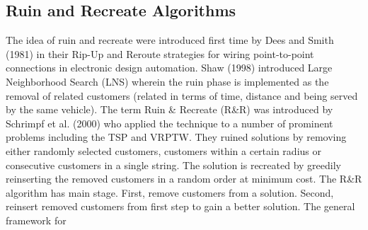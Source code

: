 \documentclass[../main.tex]{}
\begin{document}
\subsection{Ruin and Recreate Algorithms}
The idea of ruin and recreate were introduced first time by Dees and Smith (1981) in their Rip-Up and Reroute strategies for wiring point-to-point connections in electronic design automation. Shaw (1998) introduced Large Neighborhood Search (LNS) wherein the ruin phase is implemented as the removal of related customers (related in terms of time, distance and being served by the same vehicle). The term Ruin \& Recreate (R\&R) was introduced by Schrimpf et al. (2000) who applied the technique to a number of prominent problems including the TSP and VRPTW. They ruined solutions by removing either randomly selected customers, customers within a certain radius or consecutive customers in a single string. The solution is recreated by greedily reinserting the removed customers in a random order at minimum cost. The R\&R algorithm has main stage. First, remove customers from a solution. Second, reinsert removed customers from first step to gain a better solution. The general framework for 
\end{document}
